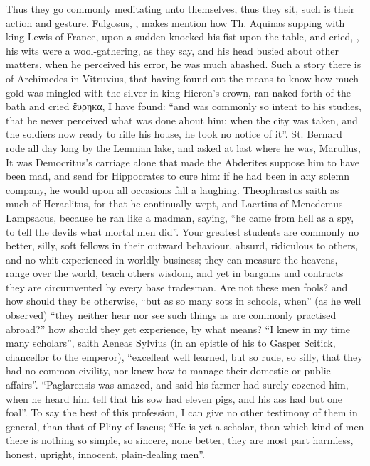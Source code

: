 Thus they go commonly meditating unto themselves, thus they sit, such is their
action and gesture. Fulgosus, , makes mention
how Th. Aquinas supping with king Lewis of France, upon a sudden knocked his
fist upon the table, and cried, , his wits
were a wool-gathering, as they say, and his head busied about other matters,
when he perceived his error, he was much abashed. Such a
story there is of Archimedes in Vitruvius, that having found out the means to
know how much gold was mingled with the silver in king Hieron's crown, ran
naked forth of the bath and cried \textgreek{ἕυρηκα}, I have found:
\enquote{and was commonly so intent to his studies, that he never
perceived what was done about him: when the city was taken, and the soldiers
now ready to rifle his house, he took no notice of it}. St. Bernard rode all
day long by the Lemnian lake, and asked at last where he was, Marullus,
 It was Democritus's carriage alone that
made the Abderites suppose him to have been mad, and send for Hippocrates to
cure him: if he had been in any solemn company, he would upon all occasions
fall a laughing. Theophrastus saith as much of Heraclitus, for that he
continually wept, and Laertius of Menedemus Lampsacus, because he ran like a
madman, saying, \enquote{he came from hell as a spy, to tell the
devils what mortal men did}. Your greatest students are commonly no better,
silly, soft fellows in their outward behaviour, absurd, ridiculous to others,
and no whit experienced in worldly business; they can measure the heavens,
range over the world, teach others wisdom, and yet in bargains and contracts
they are circumvented by every base tradesman. Are not these men fools? and how
should they be otherwise, \enquote{but as so many sots in schools, when} (as
he well observed) \enquote{they neither hear nor see such things
as are commonly practised abroad?} how should they get experience, by what
means? \enquote{I knew in my time many scholars}, saith Aeneas
Sylvius (in an epistle of his to Gasper Scitick, chancellor to the emperor),
\enquote{excellent well learned, but so rude, so silly, that they had no common
civility, nor knew how to manage their domestic or public affairs}.
\enquote{Paglarensis was amazed, and said his farmer had surely cozened him, when he
heard him tell that his sow had eleven pigs, and his ass had but one foal}. To
say the best of this profession, I can give no other testimony of them in
general, than that of Pliny of Isaeus; \enquote{He is yet a
scholar, than which kind of men there is nothing so simple, so sincere, none
better, they are most part harmless, honest, upright, innocent, plain-dealing
men}.

